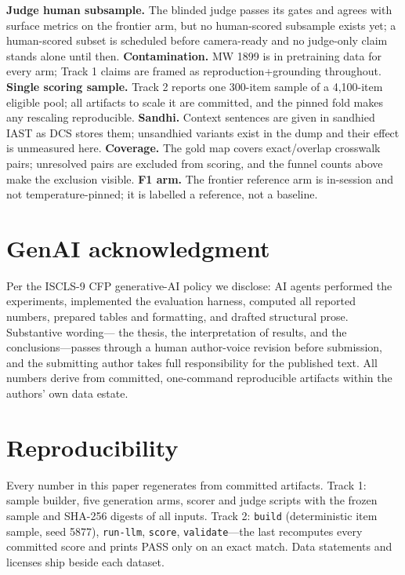 \documentclass[11pt]{article}
\begin{document}
\textbf{Judge human subsample.} The blinded judge passes its gates and agrees with
surface metrics on the frontier arm, but no human-scored subsample exists yet; a
human-scored subset is scheduled before camera-ready and no judge-only claim stands
alone until then. \textbf{Contamination.} MW 1899 is in pretraining data for every arm;
Track 1 claims are framed as reproduction+grounding throughout. \textbf{Single scoring
sample.} Track 2 reports one 300-item sample of a 4{,}100-item eligible pool; all
artifacts to scale it are committed, and the pinned fold makes any rescaling
reproducible. \textbf{Sandhi.} Context sentences are given in sandhied IAST as DCS
stores them; unsandhied variants exist in the dump and their effect is unmeasured here.
\textbf{Coverage.} The gold map covers exact/overlap crosswalk pairs; unresolved pairs
are excluded from scoring, and the funnel counts above make the exclusion visible.
\textbf{F1 arm.} The frontier reference arm is in-session and not temperature-pinned;
it is labelled a reference, not a baseline.

\section*{GenAI acknowledgment}

Per the ISCLS-9 CFP generative-AI policy we disclose: AI agents performed the
experiments, implemented the evaluation harness, computed all reported numbers,
prepared tables and formatting, and drafted structural prose. Substantive wording---
the thesis, the interpretation of results, and the conclusions---passes through a human
author-voice revision before submission, and the submitting author takes full
responsibility for the published text. All numbers derive from committed, one-command
reproducible artifacts within the authors' own data estate.

\section*{Reproducibility}

Every number in this paper regenerates from committed artifacts. Track 1: sample
builder, five generation arms, scorer and judge scripts with the frozen sample and
SHA-256 digests of all inputs. Track 2: \texttt{build} (deterministic item sample, seed
5877), \texttt{run-llm}, \texttt{score}, \texttt{validate}---the last recomputes every
committed score and prints PASS only on an exact match. Data statements and licenses
ship beside each dataset.



\end{document}
